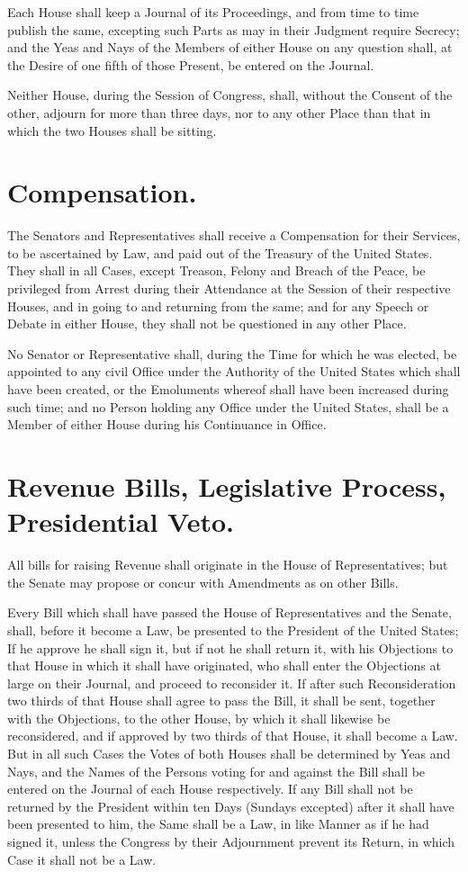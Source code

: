\documentclass[12pt]{constitution}
\begin{document}
Each House shall keep a Journal of its Proceedings, and from time to time
publish the same, excepting such Parts as may in their Judgment require
Secrecy; and the Yeas and Nays of the Members of either House on any question
shall, at the Desire of one fifth of those Present, be entered on the Journal.

Neither House, during the Session of Congress, shall, without the Consent of
the other, adjourn for more than three days, nor to any other Place than that
in which the two Houses shall be sitting.


\section{Compensation.}
The Senators and Representatives shall receive a Compensation for their
Services, to be ascertained by Law, and paid out of the Treasury of the United
States. They shall in all Cases, except Treason, Felony and Breach of the
Peace, be privileged from Arrest during their Attendance at the Session of
their respective Houses, and in going to and returning from the same; and for
any Speech or Debate in either House, they shall not be questioned in any other
Place.

No Senator or Representative shall, during the Time for which he was elected,
be appointed to any civil Office under the Authority of the United States which
shall have been created, or the Emoluments whereof shall have been increased
during such time; and no Person holding any Office under the United States,
shall be a Member of either House during his Continuance in Office.


\section{Revenue Bills, Legislative Process, Presidential Veto.}
All bills for raising Revenue shall originate in the House of Representatives;
but the Senate may propose or concur with Amendments as on other Bills.

Every Bill which shall have passed the House of Representatives and the Senate,
shall, before it become a Law, be presented to the President of the United
States; If he approve he shall sign it, but if not he shall return it, with his
Objections to that House in which it shall have originated, who shall enter the
Objections at large on their Journal, and proceed to reconsider it. If after
such Reconsideration two thirds of that House shall agree to pass the Bill, it
shall be sent, together with the Objections, to the other House, by which it
shall likewise be reconsidered, and if approved by two thirds of that House, it
shall become a Law. But in all such Cases the Votes of both Houses shall be
determined by Yeas and Nays, and the Names of the Persons voting for and
against the Bill shall be entered on the Journal of each House respectively. If
any Bill shall not be returned by the President within ten Days (Sundays
excepted) after it shall have been presented to him, the Same shall be a Law,
in like Manner as if he had signed it, unless the Congress by their Adjournment
prevent its Return, in which Case it shall not be a Law.
\end{document}
